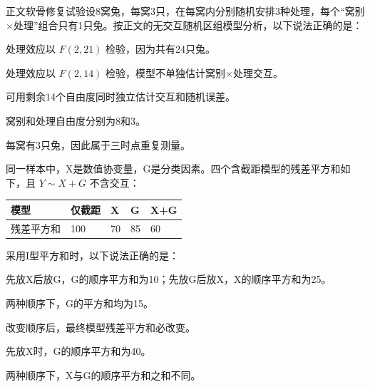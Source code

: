 \par\addvspace{6pt}\noindent\begin{minipage}{\linewidth}


正文软骨修复试验设8窝兔，每窝3只，在每窝内分别随机安排3种处理，每个``窝别×处理''组合只有1只兔。按正文的无交互随机区组模型分析，以下说法正确的是：


\begin{choices}

\item 处理效应以 \(F(2,21)\) 检验，因为共有24只兔。

\item 处理效应以 \(F(2,14)\) 检验，模型不单独估计窝别×处理交互。

\item 可用剩余14个自由度同时独立估计交互和随机误差。

\item 窝别和处理自由度分别为8和3。

\item 每窝有3只兔，因此属于三时点重复测量。

\end{choices}

\end{minipage}\par\vspace{4pt}


同一样本中，X是数值协变量，G是分类因素。四个含截距模型的残差平方和如下，且 \(Y\sim X+G\) 不含交互：

\begin{center}\small\setlength{\tabcolsep}{5pt}\renewcommand{\arraystretch}{1.18}\begin{tabular}{@{}lllll@{}}
\toprule
模型 & 仅截距 & X & G & X+G \\
\midrule

残差平方和 & 100 & 70 & 85 & 60 \\
\bottomrule\end{tabular}\end{center}

采用I型平方和时，以下说法正确的是：


\begin{choices}

\item 先放X后放G，G的顺序平方和为10；先放G后放X，X的顺序平方和为25。

\item 两种顺序下，G的平方和均为15。

\item 改变顺序后，最终模型残差平方和必改变。

\item 先放X时，G的顺序平方和为40。

\item 两种顺序下，X与G的顺序平方和之和不同。

\end{choices}

